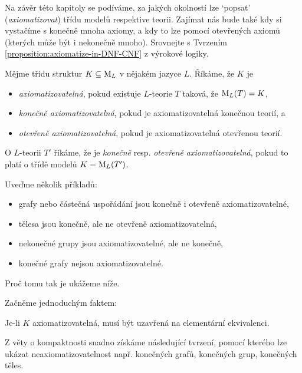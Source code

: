 Na závěr této kapitoly se podíváme, za jakých okolností lze `popsat' (\emph{axiomatizovat}) třídu modelů respektive teorii. Zajímat nás bude také kdy si vystačíme s konečně mnoha axiomy, a kdy to lze pomocí otevřených axiomů (kterých může být i nekonečně mnoho). Srovnejte s Tvrzením \ref{proposition:axiomatize-in-DNF-CNF} z výrokové logiky. 

\begin{definition}[Axiomatizovatelnost]
Mějme třídu struktur $K\subseteq\operatorname{M}_L$ v nějakém jazyce $L$. Říkáme, že $K$ je
\begin{itemize}
    \item \emph{axiomatizovatelná}, pokud existuje $L$-teorie $T$ taková, že $\operatorname{M}_L(T)=K$,
    \item \emph{konečně axiomatizovatelná}, pokud je axiomatizovatelná konečnou teorií, a
    \item \emph{otevřeně axiomatizovatelná}, pokud je axiomatizovatelná otevřenou teorií.
\end{itemize}
O $L$-teorii $T'$ říkáme, že je \emph{konečně} resp. \emph{otevřeně axiomatizovatelná}, pokud to platí o třídě modelů $K=\operatorname{M}_L(T')$.
\end{definition}

\begin{example}
    Uveďme několik příkladů:
    \begin{itemize}
        \item grafy nebo částečná uspořádání jsou konečně i otevřeně axiomatizovatelné,
        \item tělesa jsou konečně, ale ne otevřeně axiomatizovatelná,
        \item nekonečné grupy jsou axiomatizovatelné, ale ne konečně,
        \item konečné grafy nejsou axiomatizovatelné.
    \end{itemize}
    Proč tomu tak je ukážeme níže.
\end{example}

Začněme jednoduchým faktem:

\begin{observation}
    Je-li $K$ axiomatizovatelná, musí být uzavřená na elementární ekvivalenci.  
\end{observation}

Z věty o kompaktnosti snadno získáme následující tvrzení, pomocí kterého lze ukázat neaxiomatizovatelnost např. konečných grafů, konečných grup, konečných těles.

